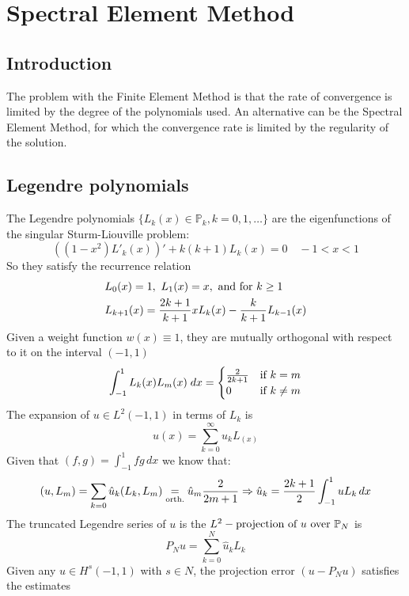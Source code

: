 \newpage
\section{Spectral Element Method}
\subsection{Introduction}
The problem with the Finite Element Method is that the rate of convergence is limited by the degree of the polynomials used. An alternative can be the Spectral Element Method, for which the convergence rate is limited by the regularity of the solution. 
\subsection{Legendre polynomials}
The Legendre polynomials \(\{L_k(x) \in \mathbb{P}_k, k = 0, 1, \ldots\}\) are the eigenfunctions of the singular Sturm-Liouville problem:
\[
    ((1-x^2)L'_k(x))' + k(k+1)L_k(x) = 0 \quad -1 < x < 1
\]
So they satisfy the recurrence relation
\begin{equation}
    \begin{split}
        &L_0(x) = 1, \ L_1(x) = x, \text{ and for } k \geq 1 \\
        &L_{k+1}(x) = \frac{2k+1}{k+1}xL_k(x) - \frac{k}{k+1}L_{k-1}(x)
    \end{split}
    \label{legendre_polynomials}
\end{equation}
Given a weight function \(w(x) \equiv 1\), they are mutually orthogonal with respect to it on the interval \((-1, 1)\)
\[
    \int_{-1}^1 L_k(x)L_m(x) \; dx = \begin{cases}
        \frac{2}{2k+1} & \text{if } k = m \\
        0 & \text{if } k \neq m
    \end{cases}
\]
The expansion of \(u \in L^2(-1,1)\) in terms of \(L_k\) is 
\[
    u(x) = \sum_{k=0}^{\infty} \hat{u}_k L_(x)
\]
Given that \((f,g) = \int_{-1}^1 fg \, dx\) we know that:
\[
    (u,L_m) = \sum_{k=0} \hat{u}_k (L_k, L_m) \underset{\text{orth.}}{=} \hat{u}_m\frac{2}{2m+1} \Rightarrow \hat{u}_k = \frac{2k+1}{2} \int_{-1}^1 u L_k \, dx
\]
The truncated Legendre series of \(u\) is the \(L^2-\text{projection of } u \text{ over } \mathbb{P}_N\) is 
\begin{equation}
    P_Nu = \sum_{k=0}^{N} \hat{u}_k L_k
\end{equation}
Given any \(u \in H^s(-1,1)\) with \(s \in N\), the projection error \((u-P_Nu)\) satisfies the estimates 
